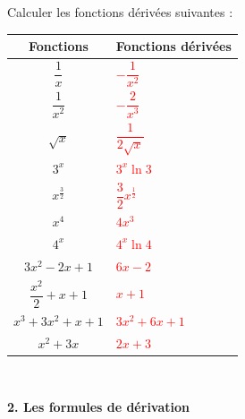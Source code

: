 \documentclass[11pt,a4paper]{article}
\begin{document}
\vfill
~~

\newpage

\\[5pt]
Calculer les fonctions dérivées suivantes : \vfill

\begin{center}
\renewcommand{\arraystretch}{3.9}

\begin{tabularx}{0.7\linewidth}{|c||>{\centering\arraybackslash}X|}
\hline 
Fonctions & Fonctions dérivées \\ 
\hline 
$\dfrac{1}{x}$ & \textcolor{red}{\textbf{$-\dfrac{1}{x^2}$}} \\ 
\hline 
$\dfrac{1}{x^2}$ & \textcolor{red}{\textbf{$-\dfrac{2}{x^3}$}} \\ 
\hline 
$\sqrt{x}$ & \textcolor{red}{\textbf{$\dfrac{1}{2\sqrt{x}}$}} \\ 
\hline 
$3^x$ & \textcolor{red}{\textbf{$3^x\ln 3$}} \\ 
\hline 
$x^{\frac{3}{2}}$ & \textcolor{red}{\textbf{$\dfrac{3}{2}x^{\frac{1}{2}}$}} \\ 
\hline 
$x^4$ & \textcolor{red}{\textbf{$4x^3$}} \\ 
\hline 
$4^x$ & \textcolor{red}{\textbf{$4^x\ln 4$}} \\ 
\hline 
$3x^2-2x+1$ & \textcolor{red}{\textbf{$6x-2$}} \\ 
\hline 
$\dfrac{x^2}{2}+x+1$ & \textcolor{red}{\textbf{$x+1$}} \\ 
\hline 
${x^3}+3x^2+x+1$ & \textcolor{red}{\textbf{$3x^2+6x+1$}} \\ 
\hline 
$x^2+3x$ & \textcolor{red}{\textbf{$2x+3$}} \\ 
\hline 
\end{tabularx}


\end{center}

\vfill
~~

\newpage

\begin{mybox}
\begin{center}    
\textbf{2. Les formules de dérivation}\end{center}
\end{mybox}
\vfill
\end{document}
